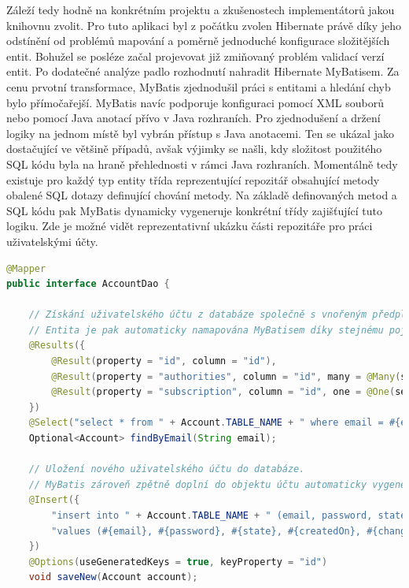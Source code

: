 \begin{itemize}
\begin{itemize}
		Záleží tedy hodně na konkrétním projektu a zkušenostech implementátorů jakou knihovnu zvolit.
		Pro tuto aplikaci byl z počátku zvolen Hibernate právě díky jeho odstínění od problémů mapování a poměrně
		jednoduché konfigurace složitějších entit.
		Bohužel se posléze začal projevovat již zmiňovaný problém validací verzí entit.
		Po dodatečné analýze padlo rozhodnutí nahradit Hibernate MyBatisem.
		Za cenu prvotní transformace, MyBatis zjednodušil práci s entitami a hledání chyb bylo přímočařejší.
		MyBatis navíc podporuje konfiguraci pomocí \ac{XML} souborů nebo pomocí Java anotací přívo v Java rozhraních.
		Pro zjednodušení a držení logiky na jednom místě byl vybrán přístup s Java anotacemi.
		Ten se ukázal jako dostačující ve většině případů, avšak výjimky se našli, kdy složitost použitého \ac{SQL} kódu
		byla na hraně přehlednosti v rámci Java rozhraních.
		Momentálně tedy existuje pro každý typ entity třída reprezentující repozitář obsahující metody obalené \ac{SQL}
		dotazy definující chování metody.
		Na základě definovaných metod a \ac{SQL} kódu pak MyBatis dynamicky vygeneruje konkrétní třídy zajišťující tuto
		logiku.
		Zde je možné vidět reprezentativní ukázku části repozitáře pro práci uživatelskými účty.
		\begin{lstlisting}[language=Java]
@Mapper
public interface AccountDao {

	// Získání uživatelského účtu z databáze společně s vnořeným předplatným a kolekcí rolí.
	// Entita je pak automaticky namapována MyBatisem díky stejnému pojmenování sloupců tabulek a atributů třídy.
	@Results({
		@Result(property = "id", column = "id"),
		@Result(property = "authorities", column = "id", many = @Many(select = "findAllRoles")),
		@Result(property = "subscription", column = "id", one = @One(select = "findSubscriptionByAccountId"))
	})
	@Select("select * from " + Account.TABLE_NAME + " where email = #{email}")
	Optional<Account> findByEmail(String email);

	// Uložení nového uživatelského účtu do databáze.
	// MyBatis zároveň zpětně doplní do objektu účtu automaticky vygenerované unikátní ID databází.
	@Insert({
		"insert into " + Account.TABLE_NAME + " (email, password, state, createdOn, changedOn, passwordChangedOn, googleExternalId, gitHubExternalId, facebookExternalId)",
		"values (#{email}, #{password}, #{state}, #{createdOn}, #{changedOn}, #{passwordChangedOn}, #{googleExternalId}, #{gitHubExternalId}, #{facebookExternalId})"
	})
	@Options(useGeneratedKeys = true, keyProperty = "id")
	void saveNew(Account account);


\end{lstlisting}
\end{itemize}
\end{itemize}
